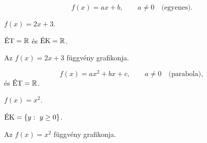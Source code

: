 \documentclass[11pt]{article}
\begin{document}
\begin{defbox}
\begin{definition}
\[
f(x)=ax+b,\qquad a\neq 0 \quad \text{(egyenes)}.
\]
\end{definition}
\end{defbox}

\begin{exbox}
\begin{example}
$f(x)=2x+3$.
\end{example}
\end{exbox}
\begin{solution}
$\ET=\R$ és $\EK=\R$.

\begin{notefig}{Az $f(x)=2x+3$ függvény grafikonja.}
\end{notefig}
\end{solution}

\begin{defbox}
\begin{definition}
\[
f(x)=ax^{2}+bx+c,\qquad a\neq 0 \quad \text{(parabola)},
\]
és $\ET=\R$.
\end{definition}
\end{defbox}

\begin{exbox}
\begin{example}
$f(x)=x^{2}$.
\end{example}
\end{exbox}
\begin{solution}
$\EK=\{y:\ y\ge 0\}$.

\begin{notefig}{Az $f(x)=x^{2}$ függvény grafikonja.}
\end{notefig}
\end{solution}
\end{document}
